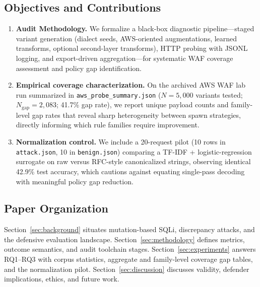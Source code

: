 \subsection{Objectives and Contributions}
\begin{enumerate}
\item \textbf{Audit Methodology.} We formalize a black-box diagnostic pipeline---staged variant generation (dialect seeds, AWS-oriented augmentations, learned transforms, optional second-layer transforms), HTTP probing with JSONL logging, and export-driven aggregation---for systematic WAF coverage assessment and policy gap identification.
\item \textbf{Empirical coverage characterization.} On the archived AWS WAF lab run summarized in \texttt{aws\_probe\_summary.json} ($N{=}5{,}000$ variants tested; $N_{\mathrm{gap}}{=}2{,}083$; 41.7\% gap rate), we report unique payload counts and family-level gap rates that reveal sharp heterogeneity between spawn strategies, directly informing which rule families require improvement.
\item \textbf{Normalization control.} We include a 20-request pilot (10 rows in \texttt{attack.json}, 10 in \texttt{benign.json}) comparing a TF-IDF + logistic-regression surrogate on raw versus RFC-style canonicalized strings, observing identical 42.9\% test accuracy, which cautions against equating single-pass decoding with meaningful policy gap reduction.
\end{enumerate}

\subsection{Paper Organization}
Section~\ref{sec:background} situates mutation-based SQLi, discrepancy attacks, and the defensive evaluation landscape. Section~\ref{sec:methodology} defines metrics, outcome semantics, and audit toolchain stages. Section~\ref{sec:experiments} answers RQ1--RQ3 with corpus statistics, aggregate and family-level coverage gap tables, and the normalization pilot. Section~\ref{sec:discussion} discusses validity, defender implications, ethics, and future work.

